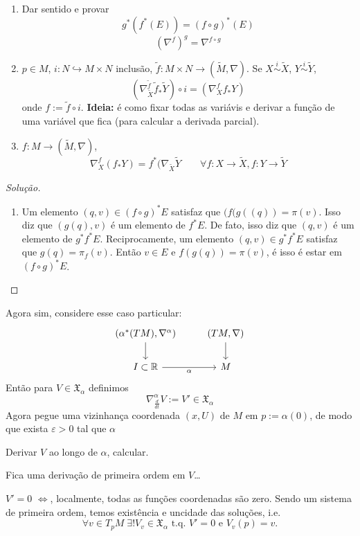 \begin{exercise}\leavevmode
\begin{enumerate}
\item Dar sentido e provar
	\[g^*(f^*(E))=(f\circ g)^*(E)\]
	\[(\nabla^f)^g=\nabla^{f \circ g}\]
\item \(p \in M\), \(i :N \hookrightarrow  M\times N\) inclusão, \(\tilde{f}:M\times N\to (\tilde{M},\nabla)\). Se \(X \overset{i}{\sim}\tilde{X}\), \(Y \overset{i}{\sim}\tilde{Y}\),
\[(\nabla_{\tilde{X}}^{\tilde{f}}\tilde{f}_*\tilde{Y})\circ i=(\nabla_X^f f_*Y)\]
onde \(f:=\tilde{f} \circ i\). \textbf{Ideia:} é como fixar todas as variávis e derivar a função de uma  variável que fica (para calcular a derivada parcial).
\item \(f:M \to (\tilde{M},\nabla)\),
	\[\nabla^f_X(f_*Y)=f^* (\nabla_{\tilde{X}}\tilde{Y}\qquad  \forall  f:X \to \tilde{X}, f:Y \to \tilde{Y}\]
\end{enumerate}
\end{exercise}
\begin{proof}[Solução]\leavevmode
\begin{enumerate}
\item Um elemento \((q,v)\in (f\circ g)^*E\) satisfaz que \((f(g((q))=\pi(v)\). Isso diz que \((g(q),v)\) é um elemento de \(f^*E\). De fato, isso diz que \((q,v)\) é um elemento de \(g^*f^*E\). Reciprocamente, um elemento \((q,v)\in g^*f^*E\) satisfaz que \(g(q)=\pi_f(v)\). Então \(v \in E\) e \(f(g(q))=\pi(v)\), é isso é estar em \((f\circ g)^*E\).
\end{enumerate}
\end{proof}
Agora sim, considere esse caso particular:
\[\begin{tikzcd}
	(\alpha^*(TM),\nabla^\alpha)\arrow[d]&(TM,\nabla)\arrow[d]\\
	I\subset\mathbb{R}\arrow[r,swap,"\alpha"]&M
\end{tikzcd}\]
Então para \(V \in \mathfrak{X}_\alpha\) definimos
\[\nabla_{\frac{d}{dt}}^\alpha V:=V'\in \mathfrak{X}_\alpha\]
Agora pegue uma vizinhança coordenada \((x,U)\) de \(M\) em \(p:=\alpha(0)\), de modo que exista \(\varepsilon>0\) tal que \(\alpha\)

Derivar \(V\) ao longo de \(\alpha\), calcular.

Fica uma derivação de primeira ordem em \(V\)…

\begin{remark}\leavevmode
\(V'=0\) \(\iff\), localmente, todas as funções coordenadas são zero. Sendo um sistema de primeira ordem, temos existência e uncidade das soluções, i.e.
\[\forall  v \in T_p M\; \exists ! V_v \in \mathfrak{X}_\alpha \text{ t.q. } V'=0\text{ e } V_v(p)=v.\]
\end{remark}

